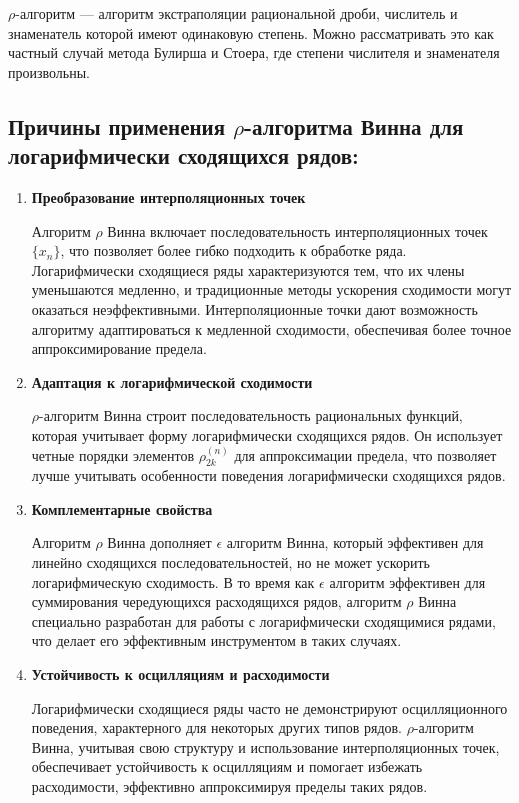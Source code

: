 \documentclass[14pt, a4paper]{extarticle}
\theoremstyle{definition}
\theoremstyle{remark}
\begin{document}
\emph{$\rho$}-алгоритм --- алгоритм экстраполяции рациональной дроби,
числитель и знаменатель которой имеют одинаковую степень. Можно
рассматривать это как частный случай метода Булирша и Стоера, где
степени числителя и знаменателя произвольны.

\subsection{Причины применения $\rho$-алгоритма Винна для логарифмически
сходящихся рядов:}

\begin{enumerate}
\item \textbf{Преобразование интерполяционных точек}

Алгоритм \emph{$\rho$} Винна включает последовательность интерполяционных
точек \(\{ x_{n}\}\), что позволяет более гибко подходить к обработке
ряда. Логарифмически сходящиеся ряды характеризуются тем, что их члены
уменьшаются медленно, и традиционные методы ускорения сходимости могут
оказаться неэффективными. Интерполяционные точки дают возможность
алгоритму адаптироваться к медленной сходимости, обеспечивая более
точное аппроксимирование предела.

  \item \textbf{Адаптация к логарифмической сходимости}

\emph{$\rho$}-алгоритм Винна строит последовательность рациональных функций,
которая учитывает форму логарифмически сходящихся рядов. Он использует
четные порядки элементов \(\rho_{2k}^{(n)}\) для аппроксимации предела,
что позволяет лучше учитывать особенности поведения логарифмически
сходящихся рядов.

  \item \textbf{Комплементарные свойства}

Алгоритм \emph{$\rho$} Винна дополняет \(\epsilon\) алгоритм Винна, который эффективен
для линейно сходящихся последовательностей, но не может ускорить
логарифмическую сходимость. В то время как \(\epsilon\) алгоритм эффективен для
суммирования чередующихся расходящихся рядов, алгоритм \emph{$\rho$} Винна
специально разработан для работы с логарифмически сходящимися рядами,
что делает его эффективным инструментом в таких случаях.
\item \textbf{Устойчивость к осцилляциям и расходимости}

Логарифмически сходящиеся ряды часто не демонстрируют осцилляционного
поведения, характерного для некоторых других типов рядов.
\emph{$\rho$}-алгоритм Винна, учитывая свою структуру и использование
интерполяционных точек, обеспечивает устойчивость к осцилляциям и
помогает избежать расходимости, эффективно аппроксимируя пределы таких
рядов.
\end{enumerate}
\end{document}
